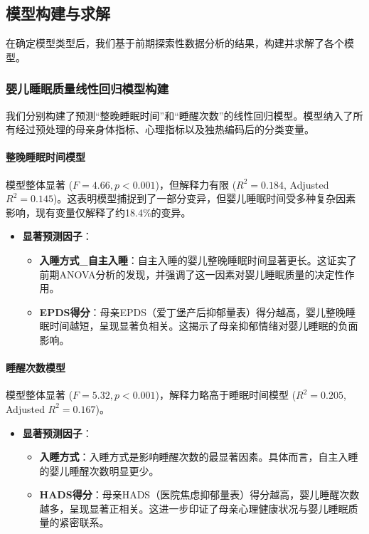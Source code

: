 \documentclass[withoutpreface,bwprint]{cumcmthesis}
\begin{document}
\subsection{模型构建与求解}
在确定模型类型后，我们基于前期探索性数据分析的结果，构建并求解了各个模型。

\subsubsection{婴儿睡眠质量线性回归模型构建}
我们分别构建了预测“整晚睡眠时间”和“睡醒次数”的线性回归模型。模型纳入了所有经过预处理的母亲身体指标、心理指标以及独热编码后的分类变量。

\paragraph{整晚睡眠时间模型}
模型整体显著 ($F=4.66, p < 0.001$)，但解释力有限 ($R^2 = 0.184$, Adjusted $R^2 = 0.145$)。这表明模型捕捉到了一部分变异，但婴儿睡眠时间受多种复杂因素影响，现有变量仅解释了约18.4\%的变异。
\begin{itemize}
    \item \textbf{显著预测因子}：
    \begin{itemize}
        \item \textbf{入睡方式\_自主入睡}：自主入睡的婴儿整晚睡眠时间显著更长。这证实了前期ANOVA分析的发现，并强调了这一因素对婴儿睡眠质量的决定性作用。
        \item \textbf{EPDS得分}：母亲EPDS（爱丁堡产后抑郁量表）得分越高，婴儿整晚睡眠时间越短，呈现显著负相关。这揭示了母亲抑郁情绪对婴儿睡眠的负面影响。
    \end{itemize}
\end{itemize}

\paragraph{睡醒次数模型}
模型整体显著 ($F=5.32, p < 0.001$)，解释力略高于睡眠时间模型 ($R^2 = 0.205$, Adjusted $R^2 = 0.167$)。
\begin{itemize}
    \item \textbf{显著预测因子}：
    \begin{itemize}
        \item \textbf{入睡方式}：入睡方式是影响睡醒次数的最显著因素。具体而言，自主入睡的婴儿睡醒次数明显更少。
        \item \textbf{HADS得分}：母亲HADS（医院焦虑抑郁量表）得分越高，婴儿睡醒次数越多，呈现显著正相关。这进一步印证了母亲心理健康状况与婴儿睡眠质量的紧密联系。
    \end{itemize}
\end{itemize}
\end{document}
